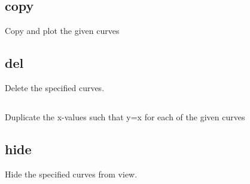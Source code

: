 \documentclass[letterpaper,10pt,english]{sphinxmanual}
\begin{document}
\subsection{copy}
\label{\detokenize{curve_control_cmds:copy}}
Copy and plot the given curves

\begin{sphinxVerbatim}[commandchars=\\\{\}]
\PYG{p}{[}\PYG{p}{]}  
\end{sphinxVerbatim}


\subsection{del}
\label{\detokenize{curve_control_cmds:del}}
Delete the specified curves. 

\begin{sphinxVerbatim}[commandchars=\\\{\}]
\PYG{p}{[}\PYG{p}{]}  
\end{sphinxVerbatim}


\subsection{}
\label{\detokenize{curve_control_cmds:id2}}
Duplicate the x-values such that y=x for each of the given curves

\begin{sphinxVerbatim}[commandchars=\\\{\}]
\PYG{p}{[}\PYG{p}{]}  
\end{sphinxVerbatim}


\subsection{hide}
\label{\detokenize{curve_control_cmds:hide}}
Hide the specified curves from view.

\begin{sphinxVerbatim}[commandchars=\\\{\}]
\PYG{p}{[}\PYG{p}{]}  
\end{sphinxVerbatim}
\end{document}
